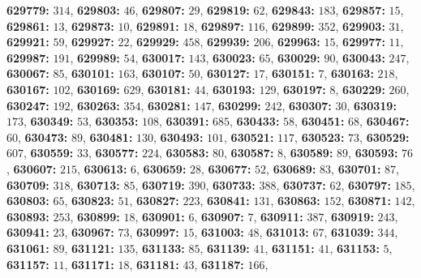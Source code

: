 \textsf{\bfseries 629779:} $314$, \textsf{\bfseries 629803:} $46$, \textsf{\bfseries 629807:} $29$, \textsf{\bfseries 629819:} $62$, \textsf{\bfseries 629843:} $183$, \textsf{\bfseries 629857:} $15$, \textsf{\bfseries 629861:} $13$, \textsf{\bfseries 629873:} $10$, \textsf{\bfseries 629891:} $18$, \textsf{\bfseries 629897:} $116$, \textsf{\bfseries 629899:} $352$, \textsf{\bfseries 629903:} $31$, \textsf{\bfseries 629921:} $59$, \textsf{\bfseries 629927:} $22$, \textsf{\bfseries 629929:} $458$, \textsf{\bfseries 629939:} $206$, \textsf{\bfseries 629963:} $15$, \textsf{\bfseries 629977:} $11$, \textsf{\bfseries 629987:} $191$, \textsf{\bfseries 629989:} $54$, \textsf{\bfseries 630017:} $143$, \textsf{\bfseries 630023:} $65$, \textsf{\bfseries 630029:} $90$, \textsf{\bfseries 630043:} $247$, \textsf{\bfseries 630067:} $85$, \textsf{\bfseries 630101:} $163$, \textsf{\bfseries 630107:} $50$, \textsf{\bfseries 630127:} $17$, \textsf{\bfseries 630151:} $7$, \textsf{\bfseries 630163:} $218$, \textsf{\bfseries 630167:} $102$, \textsf{\bfseries 630169:} $629$, \textsf{\bfseries 630181:} $44$, \textsf{\bfseries 630193:} $129$, \textsf{\bfseries 630197:} $8$, \textsf{\bfseries 630229:} $260$, \textsf{\bfseries 630247:} $192$, \textsf{\bfseries 630263:} $354$, \textsf{\bfseries 630281:} $147$, \textsf{\bfseries 630299:} $242$, \textsf{\bfseries 630307:} $30$, \textsf{\bfseries 630319:} $173$, \textsf{\bfseries 630349:} $53$, \textsf{\bfseries 630353:} $108$, \textsf{\bfseries 630391:} $685$, \textsf{\bfseries 630433:} $58$, \textsf{\bfseries 630451:} $68$, \textsf{\bfseries 630467:} $60$, \textsf{\bfseries 630473:} $89$, \textsf{\bfseries 630481:} $130$, \textsf{\bfseries 630493:} $101$, \textsf{\bfseries 630521:} $117$, \textsf{\bfseries 630523:} $73$, \textsf{\bfseries 630529:} $607$, \textsf{\bfseries 630559:} $33$, \textsf{\bfseries 630577:} $224$, \textsf{\bfseries 630583:} $80$, \textsf{\bfseries 630587:} $8$, \textsf{\bfseries 630589:} $89$, \textsf{\bfseries 630593:} $76$, \textsf{\bfseries 630607:} $215$, \textsf{\bfseries 630613:} $6$, \textsf{\bfseries 630659:} $28$, \textsf{\bfseries 630677:} $52$, \textsf{\bfseries 630689:} $83$, \textsf{\bfseries 630701:} $87$, \textsf{\bfseries 630709:} $318$, \textsf{\bfseries 630713:} $85$, \textsf{\bfseries 630719:} $390$, \textsf{\bfseries 630733:} $388$, \textsf{\bfseries 630737:} $62$, \textsf{\bfseries 630797:} $185$, \textsf{\bfseries 630803:} $65$, \textsf{\bfseries 630823:} $51$, \textsf{\bfseries 630827:} $223$, \textsf{\bfseries 630841:} $131$, \textsf{\bfseries 630863:} $152$, \textsf{\bfseries 630871:} $142$, \textsf{\bfseries 630893:} $253$, \textsf{\bfseries 630899:} $18$, \textsf{\bfseries 630901:} $6$, \textsf{\bfseries 630907:} $7$, \textsf{\bfseries 630911:} $387$, \textsf{\bfseries 630919:} $243$, \textsf{\bfseries 630941:} $23$, \textsf{\bfseries 630967:} $73$, \textsf{\bfseries 630997:} $15$, \textsf{\bfseries 631003:} $48$, \textsf{\bfseries 631013:} $67$, \textsf{\bfseries 631039:} $344$, \textsf{\bfseries 631061:} $89$, \textsf{\bfseries 631121:} $135$, \textsf{\bfseries 631133:} $85$, \textsf{\bfseries 631139:} $41$, \textsf{\bfseries 631151:} $41$, \textsf{\bfseries 631153:} $5$, \textsf{\bfseries 631157:} $11$, \textsf{\bfseries 631171:} $18$, \textsf{\bfseries 631181:} $43$, \textsf{\bfseries 631187:} $166$, 
